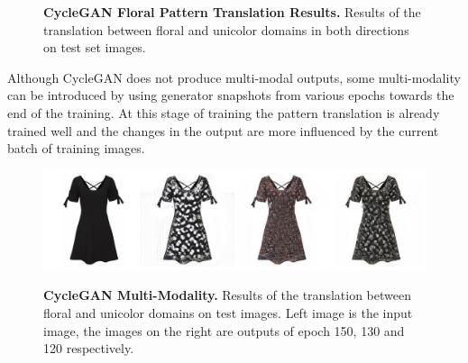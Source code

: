\documentclass[12pt]{report}
\begin{document}
\begin{figure}[t]
\centering
{}
\caption{\label{fig:cycle_floral_results} \textbf{CycleGAN Floral Pattern Translation Results.} Results of the translation between floral and unicolor domains in both directions on test set images.}
\end{figure}

Although CycleGAN does not produce multi-modal outputs, some multi-modality can be introduced by using generator snapshots from various epochs towards the end of the training. At this stage of training the pattern translation is already trained well and the changes in the output are more influenced by the current batch of training images. 

\begin{figure}[h]
\centering
{\includegraphics[width=\linewidth]{04_experiments/cyclegan/floral_multimodal}}
\caption{\label{fig:cycle_floral_multimodal} \textbf{CycleGAN Multi-Modality.} Results of the translation between floral and unicolor domains on test images. Left image is the input image, the images on the right are outputs of epoch 150, 130 and 120 respectively.}
\end{figure}
\end{document}
